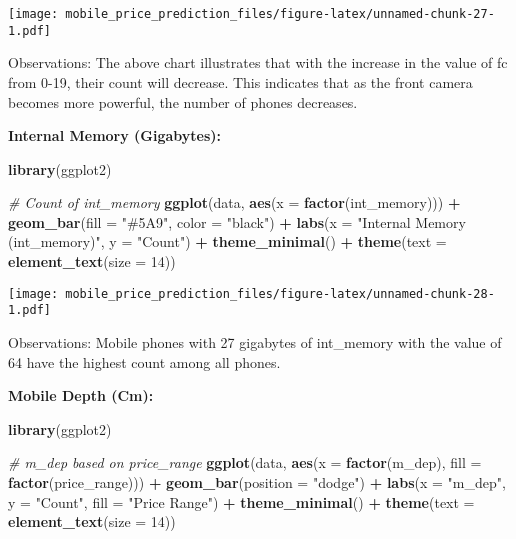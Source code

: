\documentclass[
]{article}
\newenvironment{Shaded}{\begin{snugshade}}{\end{snugshade}}
\newcommand{\AttributeTok}[1]{\textcolor[rgb]{0.13,0.29,0.53}{#1}}
\newcommand{\CommentTok}[1]{\textcolor[rgb]{0.56,0.35,0.01}{\textit{#1}}}
\newcommand{\DecValTok}[1]{\textcolor[rgb]{0.00,0.00,0.81}{#1}}
\newcommand{\FunctionTok}[1]{\textcolor[rgb]{0.13,0.29,0.53}{\textbf{#1}}}
\newcommand{\NormalTok}[1]{#1}
\newcommand{\SpecialCharTok}[1]{\textcolor[rgb]{0.81,0.36,0.00}{\textbf{#1}}}
\newcommand{\StringTok}[1]{\textcolor[rgb]{0.31,0.60,0.02}{#1}}
\begin{document}
\texttt{[image: mobile\_price\_prediction\_files/figure-latex/unnamed-chunk-27-1.pdf]}

Observations: The above chart illustrates that with the increase in the
value of fc from 0-19, their count will decrease. This indicates that as
the front camera becomes more powerful, the number of phones decreases.

\textbf{Internal Memory (Gigabytes):}

\begin{Shaded}
\begin{Highlighting}[]
\FunctionTok{library}\NormalTok{(ggplot2)}

\CommentTok{\# Count of int\_memory}
\FunctionTok{ggplot}\NormalTok{(data, }\FunctionTok{aes}\NormalTok{(}\AttributeTok{x =} \FunctionTok{factor}\NormalTok{(int\_memory))) }\SpecialCharTok{+}
  \FunctionTok{geom\_bar}\NormalTok{(}\AttributeTok{fill =} \StringTok{"\#5A9"}\NormalTok{, }\AttributeTok{color =} \StringTok{"black"}\NormalTok{) }\SpecialCharTok{+}
  \FunctionTok{labs}\NormalTok{(}\AttributeTok{x =} \StringTok{"Internal Memory (int\_memory)"}\NormalTok{, }\AttributeTok{y =} \StringTok{"Count"}\NormalTok{) }\SpecialCharTok{+}
  \FunctionTok{theme\_minimal}\NormalTok{() }\SpecialCharTok{+}
  \FunctionTok{theme}\NormalTok{(}\AttributeTok{text =} \FunctionTok{element\_text}\NormalTok{(}\AttributeTok{size =} \DecValTok{14}\NormalTok{))}
\end{Highlighting}
\end{Shaded}

\texttt{[image: mobile\_price\_prediction\_files/figure-latex/unnamed-chunk-28-1.pdf]}

Observations: Mobile phones with 27 gigabytes of int\_memory with the
value of 64 have the highest count among all phones.

\textbf{Mobile Depth (Cm):}

\begin{Shaded}
\begin{Highlighting}[]
\FunctionTok{library}\NormalTok{(ggplot2)}

\CommentTok{\# m\_dep based on price\_range}
\FunctionTok{ggplot}\NormalTok{(data, }\FunctionTok{aes}\NormalTok{(}\AttributeTok{x =} \FunctionTok{factor}\NormalTok{(m\_dep), }\AttributeTok{fill =} \FunctionTok{factor}\NormalTok{(price\_range))) }\SpecialCharTok{+}
  \FunctionTok{geom\_bar}\NormalTok{(}\AttributeTok{position =} \StringTok{"dodge"}\NormalTok{) }\SpecialCharTok{+}
  \FunctionTok{labs}\NormalTok{(}\AttributeTok{x =} \StringTok{"m\_dep"}\NormalTok{, }\AttributeTok{y =} \StringTok{"Count"}\NormalTok{, }\AttributeTok{fill =} \StringTok{"Price Range"}\NormalTok{) }\SpecialCharTok{+}
  \FunctionTok{theme\_minimal}\NormalTok{() }\SpecialCharTok{+}
  \FunctionTok{theme}\NormalTok{(}\AttributeTok{text =} \FunctionTok{element\_text}\NormalTok{(}\AttributeTok{size =} \DecValTok{14}\NormalTok{))}
\end{Highlighting}
\end{Shaded}
\end{document}
